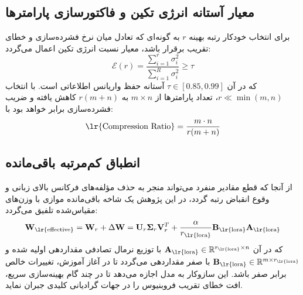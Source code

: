 \documentclass[12pt,a4paper]{report}
\theoremstyle{definition}
\begin{document}
\subsection{معیار آستانه انرژی تکین و فاکتورسازی پارامترها}
برای انتخاب خودکار رتبه بهینه $r$ به گونه‌ای که تعادل میان نرخ فشرده‌سازی و خطای تقریب برقرار باشد، معیار نسبت انرژی تکین  اعمال می‌گردد:
\begin{equation}
\mathcal{E}(r) = \frac{\sum_{i=1}^r \sigma_i^2}{\sum_{i=1}^R \sigma_i^2} \ge \tau
\end{equation}
که در آن $\tau \in [0.85, 0.99]$ آستانه حفظ واریانس اطلاعاتی است. با انتخاب $r \ll \min(m, n)$، تعداد پارامترها از $m \times n$ به $r(m + n)$ کاهش یافته و ضریب فشرده‌سازی برابر خواهد بود با:
\begin{equation}
\text{\lr{Compression Ratio}} = \frac{m \cdot n}{r(m + n)}
\end{equation}

\subsection{انطباق کم‌مرتبه باقی‌مانده }
از آنجا که قطع مقادیر منفرد می‌تواند منجر به حذف مؤلفه‌های فرکانس بالای زبانی و وقوع انقباض رتبه  گردد، در این پژوهش یک شاخه باقی‌مانده موازی با وزن‌های مقیاس‌شده  تلفیق می‌گردد:
\begin{equation}
\mathbf{W}_{\text{\lr{effective}}} = \mathbf{W}_r + \Delta \mathbf{W} = \mathbf{U}_r \mathbf{\Sigma}_r \mathbf{V}_r^T + \frac{\alpha}{r_{\text{\lr{lora}}}} \mathbf{B}_{\text{\lr{lora}}} \mathbf{A}_{\text{\lr{lora}}}
\end{equation}
که در آن $\mathbf{A}_{\text{\lr{lora}}} \in \mathbb{R}^{r_{\text{\lr{lora}}} \times n}$ با توزیع نرمال تصادفی مقداردهی اولیه شده و $\mathbf{B}_{\text{\lr{lora}}} \in \mathbb{R}^{m \times r_{\text{\lr{lora}}}}$ با صفر مقداردهی می‌گردد تا در آغاز آموزش، تغییرات خالص برابر صفر باشد. این سازوکار به مدل اجازه می‌دهد تا در چند گام بهینه‌سازی سریع، افت خطای تقریب فروبنیوس را در جهات گرادیانی کلیدی جبران نماید.
\end{document}
